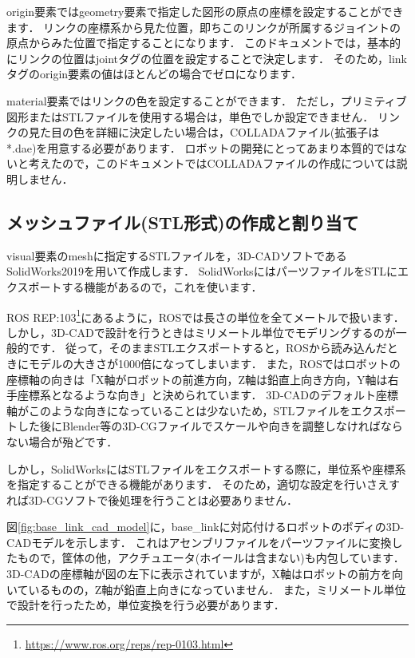 \documentclass[{../../master}]{subfiles}
\begin{document}
\textsf{origin}要素では\textsf{geometry}要素で指定した図形の原点の座標を設定することができます．
リンクの座標系から見た位置，即ちこのリンクが所属するジョイントの原点からみた位置で指定することになります．
このドキュメントでは，基本的にリンクの位置は\textsf{joint}タグの位置を設定することで決定します．
そのため，\textsf{link}タグの\textsf{origin}要素の値はほとんどの場合でゼロになります．

\textsf{material}要素ではリンクの色を設定することができます．
ただし，プリミティブ図形またはSTLファイルを使用する場合は，単色でしか設定できません．
リンクの見た目の色を詳細に決定したい場合は，COLLADAファイル(拡張子は\textsf{*.dae})を用意する必要があります．
ロボットの開発にとってあまり本質的ではないと考えたので，このドキュメントではCOLLADAファイルの作成については説明しません．

\subsection{メッシュファイル(STL形式)の作成と割り当て}
\label{sec:base_link_create_mesh_file}

\textsf{visual}要素の\textsf{mesh}に指定するSTLファイルを，3D-CADソフトであるSolidWorks2019を用いて作成します．
SolidWorksにはパーツファイルをSTLにエクスポートする機能があるので，これを使います．

ROS REP:103\footnote{\url{https://www.ros.org/reps/rep-0103.html}}にあるように，ROSでは長さの単位を全てメートルで扱います．
しかし，3D-CADで設計を行うときはミリメートル単位でモデリングするのが一般的です．
従って，そのままSTLエクスポートすると，ROSから読み込んだときにモデルの大きさが1000倍になってしまいます．
また，ROSではロボットの座標軸の向きは「X軸がロボットの前進方向，Z軸は鉛直上向き方向，Y軸は右手座標系となるような向き」と決められています．
3D-CADのデフォルト座標軸がこのような向きになっていることは少ないため，STLファイルをエクスポートした後にBlender等の3D-CGファイルでスケールや向きを調整しなければならない場合が殆どです．

しかし，SolidWorksにはSTLファイルをエクスポートする際に，単位系や座標系を指定することができる機能があります．
そのため，適切な設定を行いさえすれば3D-CGソフトで後処理を行うことは必要ありません．

図\ref{fig:base_link_cad_model}に，\textsf{base\_link}に対応付けるロボットのボディの3D-CADモデルを示します．
これはアセンブリファイルをパーツファイルに変換したもので，筐体の他，アクチュエータ(ホイールは含まない)も内包しています．
3D-CADの座標軸が図の左下に表示されていますが，X軸はロボットの前方を向いているものの，Z軸が鉛直上向きになっていません．
また，ミリメートル単位で設計を行ったため，単位変換を行う必要があります．
\end{document}
